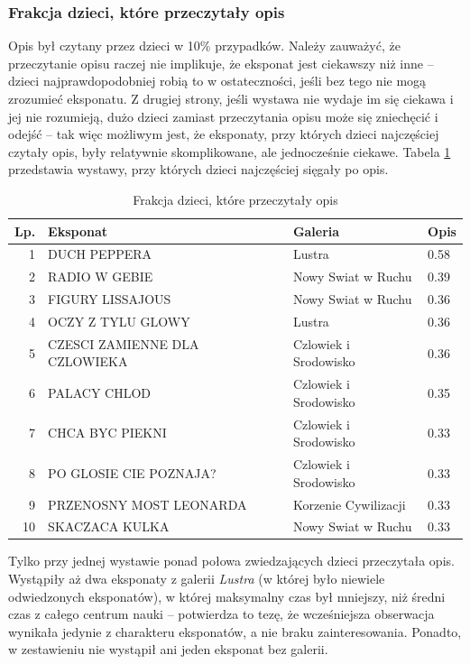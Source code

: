 \documentclass[conference]{IEEEtran}
\begin{document}
\subsubsection{Frakcja dzieci, które przeczytały opis}
Opis był czytany przez dzieci w 10\% przypadków. Należy zauważyć, że przeczytanie opisu raczej nie implikuje, że eksponat jest ciekawszy niż inne -- dzieci najprawdopodobniej robią to w ostateczności, jeśli bez tego nie mogą zrozumieć eksponatu. Z drugiej strony, jeśli wystawa nie wydaje im się ciekawa i jej nie rozumieją, dużo dzieci zamiast przeczytania opisu może się zniechęcić i odejść -- tak więc możliwym jest, że eksponaty, przy których dzieci najczęściej czytały opis, były relatywnie skomplikowane, ale jednocześnie ciekawe.
Tabela \ref{top_opis} przedstawia wystawy, przy których dzieci najczęściej sięgały po opis.
\begin{table}[H]
\caption{Frakcja dzieci, które przeczytały opis}
\label{top_opis}
\centering
\begin{tabular}{|r|p{3.3cm}|l|l|}
\hline
\textbf{Lp.} & \textbf{Eksponat} & \textbf{Galeria} & \textbf{Opis} \\
\hline
1  &                  DUCH PEPPERA &                Lustra & 0.58 \\
2  &                 RADIO W GEBIE &    Nowy Swiat w Ruchu & 0.39 \\
3  &              FIGURY LISSAJOUS &    Nowy Swiat w Ruchu & 0.36 \\
4  &             OCZY Z TYLU GLOWY &                Lustra & 0.36 \\
5  & CZESCI ZAMIENNE DLA CZLOWIEKA & Czlowiek i Srodowisko & 0.36 \\
6  &                  PALACY CHLOD & Czlowiek i Srodowisko & 0.35 \\
7  &               CHCA BYC PIEKNI & Czlowiek i Srodowisko & 0.33 \\
8  &        PO GLOSIE CIE POZNAJA? & Czlowiek i Srodowisko & 0.33 \\
9  &       PRZENOSNY MOST LEONARDA &  Korzenie Cywilizacji & 0.33 \\
10 &                SKACZACA KULKA &    Nowy Swiat w Ruchu & 0.33 \\
\hline
\end{tabular}
\end{table}
Tylko przy jednej wystawie ponad połowa zwiedzających dzieci przeczytała opis. Wystąpiły aż dwa eksponaty z galerii \textit{Lustra} (w której było niewiele odwiedzonych eksponatów), w której maksymalny czas był mniejszy, niż średni czas z całego centrum nauki -- potwierdza to tezę, że wcześniejsza obserwacja wynikała jedynie z charakteru eksponatów, a nie braku zainteresowania. Ponadto, w zestawieniu nie wystąpił ani jeden eksponat bez galerii.
\end{document}
